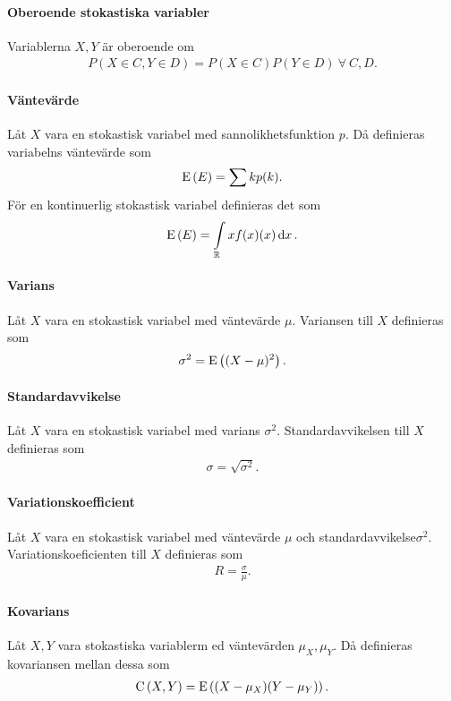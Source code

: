 \paragraph{Oberoende stokastiska variabler}
Variablerna $X, Y$ är oberoende om
\begin{align*}
	P(X\in C, Y\in D) = P(X\in C)P(Y\in D)\ \forall\ C, D.
\end{align*}

\paragraph{Väntevärde}
Låt $X$ vara en stokastisk variabel med sannolikhetsfunktion $p$. Då definieras variabelns väntevärde som
\begin{align*}
	\text{E}\left(E\right) = \sum kp(k).
\end{align*}
För en kontinuerlig stokastisk variabel definieras det som
\begin{align*}
	\text{E}\left(E\right) = \int\limits_{\mathbb{R}}{}xf(x)(x)\dd{x}.
\end{align*}

\paragraph{Varians}
Låt $X$ vara en stokastisk variabel med väntevärde $\mu$. Variansen till $X$ definieras som
\begin{align*}
	\sigma^2 = \text{E}\left((X - \mu)^2\right).
\end{align*}

\paragraph{Standardavvikelse}
Låt $X$ vara en stokastisk variabel med varians $\sigma^2$. Standardavvikelsen till $X$ definieras som
\begin{align*}
	\sigma = \sqrt{\sigma^2}.
\end{align*}

\paragraph{Variationskoefficient}
Låt $X$ vara en stokastisk variabel med väntevärde $\mu$ och standardavvikelse$\sigma^2$. Variationskoeficienten till $X$ definieras som
\begin{align*}
	R = \frac{\sigma}{\mu}.
\end{align*}

\paragraph{Kovarians}
Låt $X, Y$ vara stokastiska variablerm ed väntevärden $\mu_{X}, \mu_{Y}$. Då definieras kovariansen mellan dessa som
\begin{align*}
	\text{C}\left(X, Y\right) = \text{E}\left((X - \mu_{X})(Y - \mu_{Y})\right).
\end{align*}


